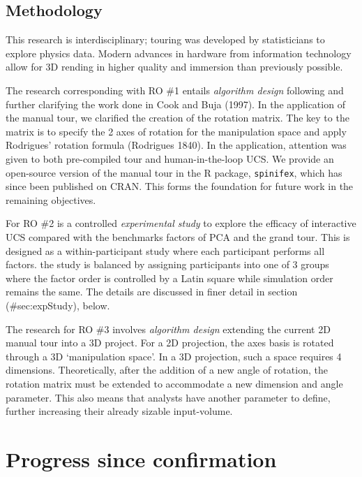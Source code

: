 \documentclass[
  11,
]{article}
\begin{document}
\hypertarget{methodology}{%
\subsection{Methodology}\label{methodology}}

This research is interdisciplinary; touring was developed by statisticians to explore physics data. Modern advances in hardware from information technology allow for 3D rending in higher quality and immersion than previously possible.

The research corresponding with RO \#1 entails \emph{algorithm design} following and further clarifying the work done in Cook and Buja (1997). In the application of the manual tour, we clarified the creation of the rotation matrix. The key to the matrix is to specify the 2 axes of rotation for the manipulation space and apply Rodrigues' rotation formula (Rodrigues 1840). In the application, attention was given to both pre-compiled tour and human-in-the-loop UCS. We provide an open-source version of the manual tour in the R package, \texttt{spinifex}, which has since been published on CRAN. This forms the foundation for future work in the remaining objectives.

For RO \#2 is a controlled \emph{experimental study} to explore the efficacy of interactive UCS compared with the benchmarks factors of PCA and the grand tour. This is designed as a within-participant study where each participant performs all factors. the study is balanced by assigning participants into one of 3 groups where the factor order is controlled by a Latin square while simulation order remains the same. The details are discussed in finer detail in section (\#sec:expStudy), below.

The research for RO \#3 involves \emph{algorithm design} extending the current 2D manual tour into a 3D project. For a 2D projection, the axes basis is rotated through a 3D `manipulation space'. In a 3D projection, such a space requires 4 dimensions. Theoretically, after the addition of a new angle of rotation, the rotation matrix must be extended to accommodate a new dimension and angle parameter. This also means that analysts have another parameter to define, further increasing their already sizable input-volume.

\hypertarget{progress-since-confirmation}{%
\section{Progress since confirmation}\label{progress-since-confirmation}}
\end{document}
